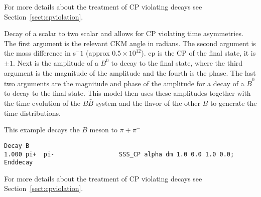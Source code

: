 \Notes
For more details about the treatment of CP violating decays 
see Section~\ref{sect:cpviolation}.





\label{ssscp}



\Expl
Decay of a scalar to two scalar and allows for CP violating 
time asymmetries. The first argument is the relevant CKM
angle in radians. The second argument is the mass difference
in s$^-1$ (approx $0.5\times 10^{12}$). 
cp is the CP of the final state, it is $\pm 1$. 
Next is the amplitude 
of a $B^0$ to decay to the final state, where the third argument is the 
magnitude of the amplitude and the fourth is the phase. The
last two arguments are the magnitude and phase of the
amplitude for a decay of a $\bar B^0$ to decay to the 
final state. This model then uses these amplitudes 
together with the time evolution of the
$B\bar B$ system and the flavor of the other
$B$ to generate the time distributions.

\Example
This example decays the $B$ meson to $\pi+\pi^-$
\begin{verbatim}
Decay B
1.000 pi+  pi-                  SSS_CP alpha dm 1.0 0.0 1.0 0.0;
Enddecay
\end{verbatim}

\Notes
For more details about the treatment of CP violating decays 
see Section~\ref{sect:cpviolation}.



\label{ssscppng}




